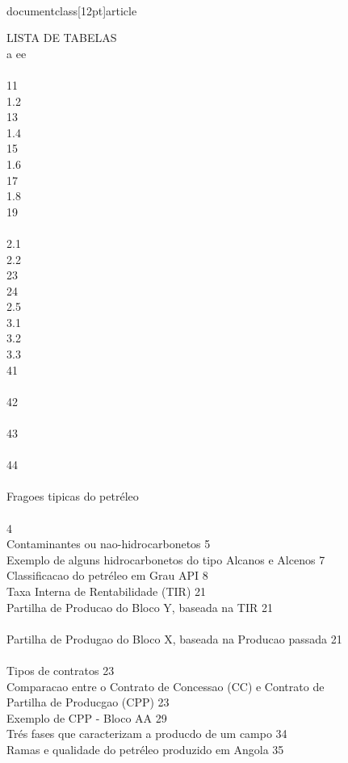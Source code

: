 \\documentclass[12pt]{article}
\begin{document}
LISTA DE TABELAS\\
a ee\\
\\
11\\
1.2\\
13\\
1.4\\
15\\
1.6\\
17\\
1.8\\
19\\
\\
2.1\\
2.2\\
23\\
24\\
2.5\\
3.1\\
3.2\\
3.3\\
41\\
\\
42\\
\\
43\\
\\
44\\
\\
Fragoes tipicas do petréleo\\
\\
4\\
Contaminantes ou nao-hidrocarbonetos 5\\
Exemplo de alguns hidrocarbonetos do tipo Alcanos e Alcenos 7\\
Classificacao do petréleo em Grau API 8\\
Taxa Interna de Rentabilidade (TIR) 21\\
Partilha de Producao do Bloco Y, baseada na TIR 21\\
\\
Partilha de Produgao do Bloco X, baseada na Producao passada 21\\
\\
Tipos de contratos 23\\
Comparacao entre o Contrato de Concessao (CC) e Contrato de\\
Partilha de Producgao (CPP) 23\\
Exemplo de CPP - Bloco AA 29\\
Trés fases que caracterizam a producdo de um campo 34\\
Ramas e qualidade do petréleo produzido em Angola 35\\
\end{document}

